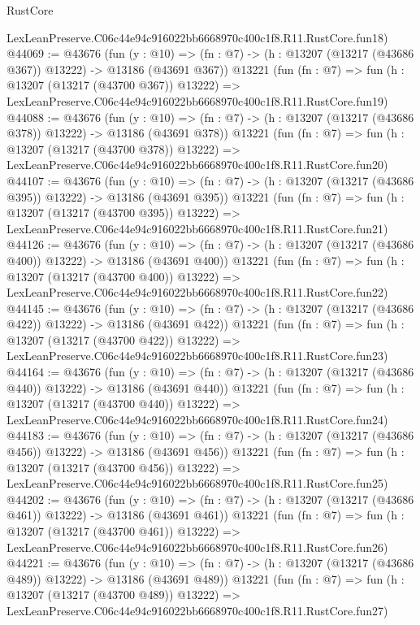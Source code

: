 \begin{lexlean}{RustCore}
\begin{coremodule}
    LexLeanPreserve.C06c44e94c916022bb6668970c400c1f8.R11.RustCore.fun18)
@44069 := @43676
    (fun (y : @10) =>
    (fn : @7) -> (h : @13207 (@13217 (@43686 @367)) @13222) -> @13186 (@43691 @367))
    @13221
    (fun (fn : @7) =>
    fun (h : @13207 (@13217 (@43700 @367)) @13222) =>
    LexLeanPreserve.C06c44e94c916022bb6668970c400c1f8.R11.RustCore.fun19)
@44088 := @43676
    (fun (y : @10) =>
    (fn : @7) -> (h : @13207 (@13217 (@43686 @378)) @13222) -> @13186 (@43691 @378))
    @13221
    (fun (fn : @7) =>
    fun (h : @13207 (@13217 (@43700 @378)) @13222) =>
    LexLeanPreserve.C06c44e94c916022bb6668970c400c1f8.R11.RustCore.fun20)
@44107 := @43676
    (fun (y : @10) =>
    (fn : @7) -> (h : @13207 (@13217 (@43686 @395)) @13222) -> @13186 (@43691 @395))
    @13221
    (fun (fn : @7) =>
    fun (h : @13207 (@13217 (@43700 @395)) @13222) =>
    LexLeanPreserve.C06c44e94c916022bb6668970c400c1f8.R11.RustCore.fun21)
@44126 := @43676
    (fun (y : @10) =>
    (fn : @7) -> (h : @13207 (@13217 (@43686 @400)) @13222) -> @13186 (@43691 @400))
    @13221
    (fun (fn : @7) =>
    fun (h : @13207 (@13217 (@43700 @400)) @13222) =>
    LexLeanPreserve.C06c44e94c916022bb6668970c400c1f8.R11.RustCore.fun22)
@44145 := @43676
    (fun (y : @10) =>
    (fn : @7) -> (h : @13207 (@13217 (@43686 @422)) @13222) -> @13186 (@43691 @422))
    @13221
    (fun (fn : @7) =>
    fun (h : @13207 (@13217 (@43700 @422)) @13222) =>
    LexLeanPreserve.C06c44e94c916022bb6668970c400c1f8.R11.RustCore.fun23)
@44164 := @43676
    (fun (y : @10) =>
    (fn : @7) -> (h : @13207 (@13217 (@43686 @440)) @13222) -> @13186 (@43691 @440))
    @13221
    (fun (fn : @7) =>
    fun (h : @13207 (@13217 (@43700 @440)) @13222) =>
    LexLeanPreserve.C06c44e94c916022bb6668970c400c1f8.R11.RustCore.fun24)
@44183 := @43676
    (fun (y : @10) =>
    (fn : @7) -> (h : @13207 (@13217 (@43686 @456)) @13222) -> @13186 (@43691 @456))
    @13221
    (fun (fn : @7) =>
    fun (h : @13207 (@13217 (@43700 @456)) @13222) =>
    LexLeanPreserve.C06c44e94c916022bb6668970c400c1f8.R11.RustCore.fun25)
@44202 := @43676
    (fun (y : @10) =>
    (fn : @7) -> (h : @13207 (@13217 (@43686 @461)) @13222) -> @13186 (@43691 @461))
    @13221
    (fun (fn : @7) =>
    fun (h : @13207 (@13217 (@43700 @461)) @13222) =>
    LexLeanPreserve.C06c44e94c916022bb6668970c400c1f8.R11.RustCore.fun26)
@44221 := @43676
    (fun (y : @10) =>
    (fn : @7) -> (h : @13207 (@13217 (@43686 @489)) @13222) -> @13186 (@43691 @489))
    @13221
    (fun (fn : @7) =>
    fun (h : @13207 (@13217 (@43700 @489)) @13222) =>
    LexLeanPreserve.C06c44e94c916022bb6668970c400c1f8.R11.RustCore.fun27)

\end{coremodule}
\end{lexlean}
